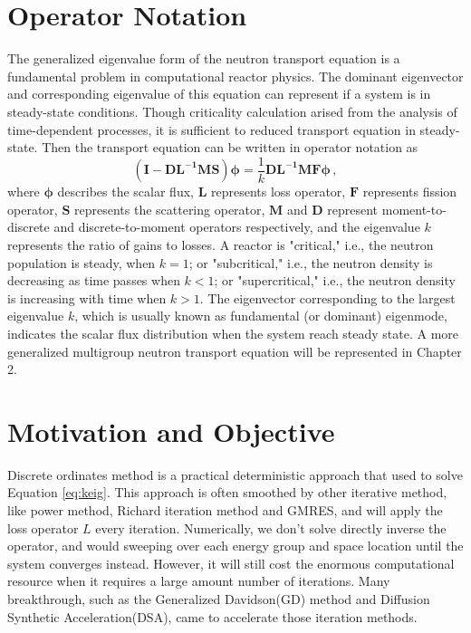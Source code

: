 \section{Operator Notation}
The generalized eigenvalue form of the neutron transport equation is a fundamental problem in computational reactor physics.
The dominant eigenvector and corresponding eigenvalue of this equation can represent if a system is in steady-state conditions.
Though criticality calculation arised from the analysis of time-dependent processes, it is sufficient to reduced transport equation in steady-state. 
Then the transport equation can be written in operator notation as
\begin{equation}
 \mathbf{(I - DL^{-1}MS)} \mathbf{\phi} = \frac{1}{k} \mathbf{DL^{-1}MF} \mathbf{\phi}  \, ,
 \label{eq:keig}
\end{equation}
where $\mathbf{\phi} $ describes the scalar flux, $\mathbf{L}$ represents loss operator,  $\mathbf{F}$ represents fission operator, $\mathbf{S}$ represents the scattering operator, $\mathbf{M}$ and $\mathbf{D}$ represent moment-to-discrete and discrete-to-moment operators respectively, and the eigenvalue $k$ represents the ratio of gains to losses.
A reactor is "critical," i.e., the neutron population is steady, when $k = 1$; or "subcritical," i.e., the neutron density is decreasing as time passes when $k < 1$; or "supercritical," i.e., the neutron density is increasing with time when $k>1$.
The eigenvector corresponding to the largest eigenvalue $k$, which is usually known as fundamental (or dominant) eigenmode, indicates the scalar flux distribution when the system reach steady state.
A more generalized multigroup neutron transport equation will be represented in Chapter 2.

\section{Motivation and Objective}
Discrete ordinates method is a practical deterministic approach that used to solve Equation \ref{eq:keig}.
This approach is often smoothed by other iterative method, like power method, Richard iteration method and GMRES, and will apply the loss operator $L$ every iteration.
Numerically, we don't solve directly inverse the operator, and would sweeping over each energy group and space location until the system converges instead.  
However, it will still cost the enormous computational resource when it requires a large amount number of iterations. 
Many breakthrough, such as the Generalized Davidson(GD) method and Diffusion Synthetic Acceleration(DSA), came to accelerate those iteration methods.

